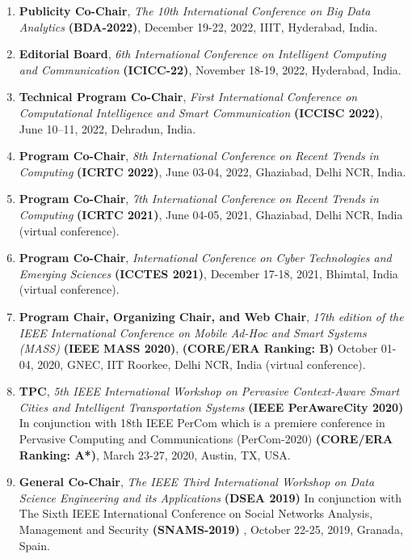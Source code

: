 
\begin{enumerate} %
\item
\textbf{Publicity Co-Chair}, \textit{The 10th International Conference on Big Data Analytics} \textbf{(BDA-2022)}, December 19-22, 2022, IIIT, Hyderabad, India.

\item
\textbf{Editorial Board}, \textit{6th International Conference on Intelligent Computing and Communication} \textbf{(ICICC-22)}, November 18-19, 2022, Hyderabad, India.

\item
\textbf{Technical Program Co-Chair}, \textit{First International Conference on Computational Intelligence and Smart Communication} \textbf{(ICCISC 2022)}, June 10–11, 2022, Dehradun, India.

\item
\textbf{Program Co-Chair}, \textit{8th International Conference on Recent Trends in Computing} \textbf{(ICRTC 2022)}, June 03-04, 2022, Ghaziabad, Delhi NCR, India.

\item
\textbf{Program Co-Chair}, \textit{7th International Conference on Recent Trends in Computing} \textbf{(ICRTC 2021)}, June 04-05, 2021, Ghaziabad, Delhi NCR, India (virtual conference).

\item
\textbf{Program Co-Chair}, \textit{International Conference on Cyber Technologies and Emerging Sciences} \textbf{(ICCTES 2021)}, December 17-18, 2021, Bhimtal, India (virtual conference).
	
\item
\textbf{Program Chair, Organizing Chair, and Web Chair}, \textit{17th edition of the IEEE International Conference on Mobile Ad-Hoc and Smart Systems (MASS)} \textbf{(IEEE MASS 2020)}, \textbf{(CORE/ERA Ranking: B)} October 01-04, 2020, GNEC, IIT Roorkee, Delhi NCR, India (virtual conference).

\item
\textbf{TPC}, \textit{5th IEEE International Workshop on Pervasive Context-Aware Smart Cities and Intelligent Transportation Systems} \textbf{(IEEE PerAwareCity 2020)} In conjunction with 18th IEEE PerCom which is a premiere conference in Pervasive Computing and Communications (PerCom-2020) \textbf{(CORE/ERA Ranking: A*)}, March 23-27, 2020, Austin, TX, USA.

\item
\textbf{General Co-Chair}, \textit{The IEEE Third International Workshop on Data Science Engineering and its Applications} \textbf{(DSEA 2019)} In conjunction with 
The Sixth IEEE International Conference on Social Networks Analysis, Management and Security \textbf{(SNAMS-2019) }, October 22-25, 2019, Granada, Spain.


\end{enumerate}
